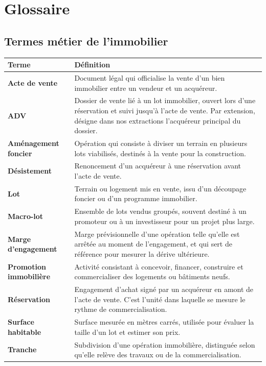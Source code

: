 \section*{Glossaire}
\vspace{1em}

\subsection*{Termes métier de l'immobilier}
\begin{longtable}{p{4cm} p{11cm}}
\textbf{Terme} & \textbf{Définition} \\
\hline
\endhead
\textbf{Acte de vente} & Document légal qui officialise la vente d'un bien immobilier entre un vendeur et un acquéreur. \\
\textbf{ADV} & Dossier de vente lié à un lot immobilier, ouvert lors d'une réservation et suivi jusqu'à l'acte de vente. Par extension, désigne dans nos extractions l'acquéreur principal du dossier. \\
\textbf{Aménagement foncier} & Opération qui consiste à diviser un terrain en plusieurs lots viabilisés, destinés à la vente pour la construction. \\
\textbf{Désistement} & Renoncement d'un acquéreur à une réservation avant l'acte de vente. \\
\textbf{Lot} & Terrain ou logement mis en vente, issu d'un découpage foncier ou d'un programme immobilier. \\
\textbf{Macro-lot} & Ensemble de lots vendus groupés, souvent destiné à un promoteur ou à un investisseur pour un projet plus large. \\
\textbf{Marge d'engagement} & Marge prévisionnelle d'une opération telle qu'elle est arrêtée au moment de l'engagement, et qui sert de référence pour mesurer la dérive ultérieure. \\
\textbf{Promotion immobilière} & Activité consistant à concevoir, financer, construire et commercialiser des logements ou bâtiments neufs. \\
\textbf{Réservation} & Engagement d'achat signé par un acquéreur en amont de l'acte de vente. C'est l'unité dans laquelle se mesure le rythme de commercialisation. \\
\textbf{Surface habitable} & Surface mesurée en mètres carrés, utilisée pour évaluer la taille d'un lot et estimer son prix. \\
\textbf{Tranche} & Subdivision d'une opération immobilière, distinguée selon qu'elle relève des travaux ou de la commercialisation. \\
\end{longtable}

